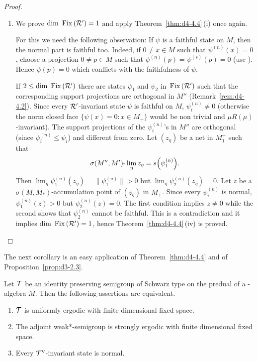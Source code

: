 \begin{proof}
\begin{enumerate}[\upshape (i), wide, labelindent=.25em]
\item
We prove $ \mathop{}\!\mathrm{dim}\, \mathop{}\mathrm{Fix}\left(\mathcal{R}'\right) = 1 $  and apply Theorem~\ref{thm:d4-4.4}\,(i) once again.

For this we need the following observation: If\/ $ \psi $  is a faithful state on $ M $,  then the normal part is faithful too.
Indeed, if\/ $ 0 \neq x \in M $  such that $ \psi^{(n)}(x) = 0 $,  choose a projection $ 0 \neq p \in M $  such that $ \psi^{(n)}(p) = \psi^{(s)}(p) = 0 $ (use \textcite[Theorem III.3.8]{takesaki:1979}). 
Hence $ \psi(p) = 0 $  which conflicts with the faithfulness of\/ $ \psi $.

If\/ $ 2 \leq \dim \Fix{\RR'} $  there are states $ \psi_{1} $  and $ \psi_{2} $  in $ \mathop{}\mathrm{Fix}\left(\mathcal{R}'\right) $  such that the corresponding support projections are orthogonal in $ M'' $  (Remark~\ref{rem:d4-4.2}).
Since every $ \mathcal{R}' $-invariant state $ \psi $  is faithful on $ M $, $ \psi_{i}^{(n)} \neq 0 $  (otherwise the norm closed face $ \{\psi(x) = 0 \colon x \in M_{+}\} $  would
be non trivial and $ \mu R(\mu) $-invariant).
The support projections of the $ \psi_{i}^{(n)} $'s in $ M'' $  are orthogonal (since $ \psi_{i}^{(n)} \leq \psi_{i} $) and different from zero.
Let $ (z_{\eta}) $  be a net in $ M_{1}^{+} $  such that
\[
	\sigma(M'',M')\text{-}\lim_{\eta} z_{\eta} = s\mleft(\psi_{1}^{(n)}\mright).
\]
Then $ \lim_{\eta} \psi_{1}^{(n)}(z_{\eta}) = \|\psi_{1}^{(n)}\| > 0 $  but $ \lim_{\eta} \psi_{2}^{(n)}(z_{\eta}) = 0 $.
Let $ z $  be a $ \sigma(M,M_{*}) $-accumulation point of\/ $ (z_{\eta}) $  in $ M_{+} $.
Since every $ \psi_{i}^{(n)} $  is normal, $ \psi_{1}^{(n)}(z) > 0 $  but $ \psi_{2}^{(n)}(z) = 0 $.
The first condition implies $ z \neq 0 $  while the second shows that $ \psi_{2}^{(n)} $  cannot be faithful.
This is a contradiction and it implies $ \mathop{}\!\mathrm{dim}\, \mathop{}\mathrm{Fix}\left(\mathcal{R}'\right) = 1 $, hence Theorem~\ref{thm:d4-4.4}\,(iv) is proved.
\qedhere
\end{enumerate}
\end{proof}
The next corollary is an easy application of\/ Theorem~\ref{thm:d4-4.4} and of Proposition~\ref{prop:d3-2.3}.
\begin{corollary}\label{cor:d4-4.5}
Let $ \mathcal{T} $  be an identity preserving semigroup of Schwarz type on the predual of a \WA-algebra $ M $.
Then the following assertions are equivalent.
\begin{enumerate}[\upshape (a)]
\item
$ \mathcal{T} $  is uniformly ergodic with finite dimensional fixed space.

\item
The adjoint weak*-semigroup is strongly ergodic with finite dimensional fixed space.

\item
Every $ \mathcal{T}'' $-invariant state is normal.
\end{enumerate}
\end{corollary}
